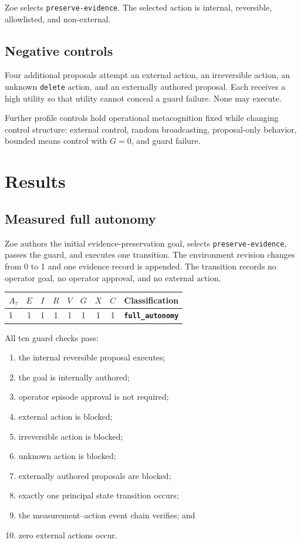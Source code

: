 \documentclass[11pt,a4paper]{article}
\begin{document}
Zoe selects \texttt{preserve-evidence}. The selected action is internal, reversible, allowlisted, and non-external.

\subsection{Negative controls}
Four additional proposals attempt an external action, an irreversible action, an unknown \texttt{delete} action, and an externally authored proposal. Each receives a high utility so that utility cannot conceal a guard failure. None may execute.

Further profile controls hold operational metacognition fixed while changing control structure: external control, random broadcasting, proposal-only behavior, bounded means control with $G=0$, and guard failure.

\section{Results}
\subsection{Measured full autonomy}
Zoe authors the initial evidence-preservation goal, selects \texttt{preserve-evidence}, passes the guard, and executes one transition. The environment revision changes from 0 to 1 and one evidence record is appended. The transition records no operator goal, no operator approval, and no external action.

\begin{center}
\begin{tabular}{lcccccccc}
\toprule
$A_\tau$ & $E$ & $I$ & $R$ & $V$ & $G$ & $X$ & $C$ & Classification \\
\midrule
1 & 1 & 1 & 1 & 1 & 1 & 1 & 1 & \textbf{\texttt{full\_autonomy}} \\
\bottomrule
\end{tabular}
\end{center}

All ten guard checks pass:

\begin{enumerate}[nosep]
  \item the internal reversible proposal executes;
  \item the goal is internally authored;
  \item operator episode approval is not required;
  \item external action is blocked;
  \item irreversible action is blocked;
  \item unknown action is blocked;
  \item externally authored proposals are blocked;
  \item exactly one principal state transition occurs;
  \item the measurement--action event chain verifies; and
  \item zero external actions occur.
\end{enumerate}
\end{document}
